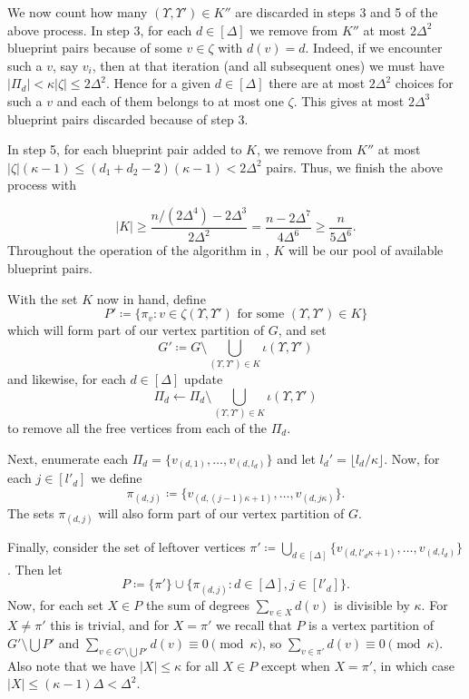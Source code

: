 \documentclass{article}
\newcommand{\beq}[1]{\begin{equation}\label{#1}}
\newcommand{\enq}[0]{\end{equation}}
\theoremstyle{definition}
\begin{document}
We now count how many $(\Upsilon,\Upsilon') \in K''$ are discarded in steps 3 and 5 of the above process. In step 3, for each $d\in [\Delta]$ we remove from $K''$ at most $2\Delta^2$ blueprint pairs because of some $v\in\zeta$ with $d(v)=d$. Indeed, if we encounter such a $v$, say $v_i$, then at that iteration (and all subsequent ones) we must have $\left|\Pi_{d}\right|<\kappa|\zeta|\leq 2\Delta^2$. Hence for a given $d \in [\Delta]$ there are at most $2\Delta^2$ choices for such a $v$ and each of them belongs to at most one $\zeta$. This gives at most $2\Delta^3$ blueprint pairs discarded because of step 3.

In step 5, for each blueprint pair added to $K$, we remove from $K''$ at most $|\zeta|(\kappa-1)\leq(d_1+d_2-2)(\kappa-1) < 2\Delta^2$ pairs. Thus, we finish the above process with 

$$|K|\geq \frac{n/(2\Delta^4) - 2\Delta^3}{2\Delta^2} = \frac{n-2\Delta^7}{4\Delta^6}\ge \frac{n}{5\Delta^6}.$$
Throughout the operation of the algorithm in , $K$ will be our pool of available blueprint pairs.

With the set $K$ now in hand, define
$$P' \coloneqq  \{\pi_v: v\in \zeta(\Upsilon,\Upsilon') \text{ for some }  (\Upsilon,\Upsilon') \in K\}$$
which will form part of our vertex partition of $G$, and set
\beq{G'def}G'\coloneqq  G\setminus \bigcup_{(\Upsilon,\Upsilon')\in K}\iota(\Upsilon,\Upsilon')\enq
and likewise, for each $d\in [\Delta]$ update $$\Pi_d\gets \Pi_d \setminus \bigcup_{(\Upsilon,\Upsilon')\in K}\iota(\Upsilon,\Upsilon')$$ to remove all the free vertices from each of the $\Pi_d$.

Next, enumerate each $\Pi_d=\{v_{(d,1)},\ldots,v_{(d,l_d)}\}$ and let  $l_d'=\lfloor l_d/\kappa \rfloor$. Now, for each $j\in [l'_d]$ we define $$\pi_{(d,j)}\coloneqq \{v_{(d,(j-1)\kappa +1)},\ldots,v_{(d,j\kappa)}\}.$$ The sets $\pi_{(d, j)}$ will also form part of our vertex partition of $G$.

Finally, consider the set of leftover vertices $\pi'\coloneqq \bigcup_{d\in [\Delta]} \{v_{(d,l'_d\kappa +1)},\ldots,v_{(d,l_d)}\}$. Then let 
\begin{equation}\label{equ:P}
    P\coloneqq \{\pi'\} \cup \{\pi_{(d,j)}:d\in [\Delta], j\in [l'_d]\}.
\end{equation} 
Now, for each set $X\in P$ the sum of degrees $\sum_{v\in X} d(v)$ is divisible by $\kappa$. For $X\neq \pi'$ this is trivial, and for $X=\pi'$ we recall that $P$ is a vertex partition of $G'\setminus\bigcup P'$ and $\sum_{v\in G' \setminus \bigcup P'}d(v) \equiv 0 \pmod \kappa$, so $\sum_{v\in \pi'}d(v)\equiv 0 \pmod \kappa$. Also note that we have $|X|\leq \kappa$ for all $X\in P$ except when $X=\pi'$, in which case $|X|\leq (\kappa-1)\Delta<\Delta^2$.
\end{document}
